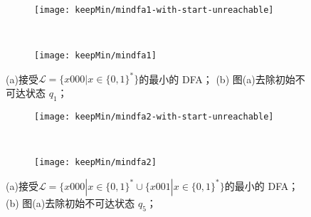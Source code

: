 \begin{figure}[!htbp]
    \centering
    \begin{subfigure}[b]{0.7\textwidth}
        \texttt{[image: keepMin/mindfa1-with-start-unreachable]}
        \caption{}
        \label{fig:keepMin-1-unreachable}
    \end{subfigure}
    \\
    \begin{subfigure}[b]{0.7\textwidth}
        \texttt{[image: keepMin/mindfa1]}
        \caption{}
        \label{fig:keepMin-1-nonTheState}
    \end{subfigure}
    \caption{(a)接受{$\mathcal{L}=\{ x000 | x \in \{ 0,1\}^{*} \}$}的最小的 DFA；  (b) 图(a)去除初始不可达状态 {$q_1$}； }
    \label{fig:keepMin-1}
\end{figure}

\begin{figure}[!htbp]
    \centering
    \begin{subfigure}[b]{0.7\textwidth}
        \texttt{[image: keepMin/mindfa2-with-start-unreachable]}
        \caption{}
        \label{fig:keepMin-2-unreachable}
    \end{subfigure}
    \\
    \begin{subfigure}[b]{0.7\textwidth}
        \texttt{[image: keepMin/mindfa2]}
        \caption{}
        \label{fig:keepMin-2-nonTheState}
    \end{subfigure}
    \caption{(a)接受{$\mathcal{L}=\{ x000 | x \in \{ 0,1\}^{*} \cup \{ x001 | x \in \{ 0,1\}^{*} \}$}的最小的 DFA；  (b) 图(a)去除初始不可达状态 {$q_5$}； }
    \label{fig:keepMin-2}
\end{figure}